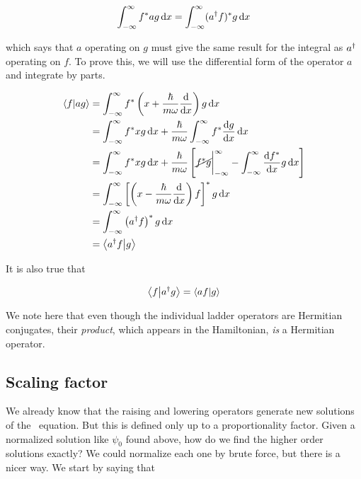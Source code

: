 \begin{equation*}
	\int_{-\infty}^{\infty} f^*ag \dd{x} = \int_{-\infty}^{\infty} (a^{\dagger} f)^*g \dd{x}
\end{equation*}

\noindent which says that $a$ operating on $g$ must give the same result for the integral as $a^{\dagger}$ operating on $f$. 
To prove this, we will use the differential form of the operator $a$ and integrate by parts.

\begin{align*}
	\braket{f}{ag} &= \int_{-\infty}^{\infty} f^* \left(x + \frac{\hbar}{m\omega} \dv{x} \right)g \dd{x} \\
	&= \int_{-\infty}^{\infty} f^*xg \dd{x} + \frac{\hbar}{m\omega} \int_{-\infty}^{\infty} f^* \dv{g}{x} \dd{x} \\
	&= \int_{-\infty}^{\infty} f^*xg \dd{x} + \frac{\hbar}{m\omega} \left[ \cancel{f^*g} \bigg|_{-\infty}^{\infty} - \int_{-\infty}^{\infty} \dv{f^*}{x} g \dd{x} \right] \\
	&= \int_{-\infty}^{\infty} \left[ \left(x - \frac{\hbar}{m\omega} \dv{x}\right) f \right]^* g \dd{x} \\
	&= \int_{-\infty}^{\infty} \left(a^{\dagger} f\right)^*g \dd{x} \\
	&= \braket{a^{\dagger} f}{g} 
\end{align*}

It is also true that

\begin{equation*}
	\braket{f}{a^{\dagger} g} = \braket{af}{g}
\end{equation*}

We note here that even though the individual ladder operators are Hermitian conjugates, their \emph{product}, which appears in the Hamiltonian, \emph{is} a Hermitian operator.


\subsection{Scaling factor}

We already know that the raising and lowering operators generate new solutions of the \Sch\ equation. 
But this is defined only up to a proportionality factor. 
Given a normalized solution like $\psi_0$ found above, how do we find the higher order solutions exactly? 
We could normalize each one by brute force, but there is a nicer way. 
We start by saying that 

